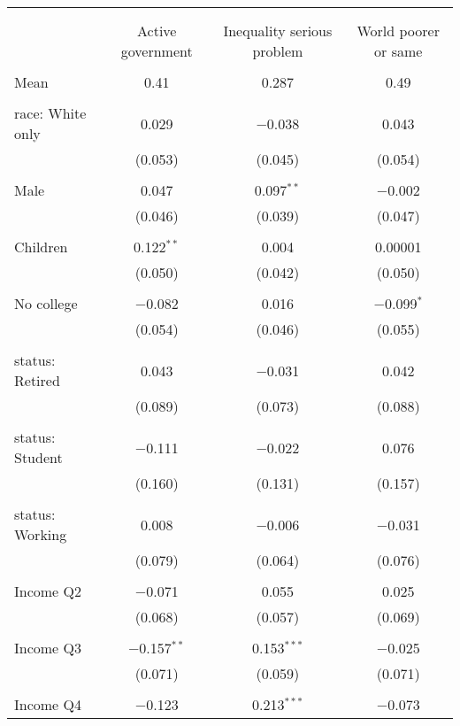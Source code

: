 
\begin{tabular}{@{\extracolsep{5pt}}lccc} 
\\[-1.8ex]\hline 
\hline \\[-1.8ex] 
\\[-1.8ex] & Active government & Inequality serious problem & World poorer or same \\ 
\hline \\[-1.8ex] 
 Mean & 0.41 & 0.287 & 0.49  \\ \hline \\[-1.8ex] race: White only & 0.029 & $-$0.038 & 0.043 \\ 
  & (0.053) & (0.045) & (0.054) \\ 
  & & & \\ 
 Male & 0.047 & 0.097$^{**}$ & $-$0.002 \\ 
  & (0.046) & (0.039) & (0.047) \\ 
  & & & \\ 
 Children & 0.122$^{**}$ & 0.004 & 0.00001 \\ 
  & (0.050) & (0.042) & (0.050) \\ 
  & & & \\ 
 No college & $-$0.082 & 0.016 & $-$0.099$^{*}$ \\ 
  & (0.054) & (0.046) & (0.055) \\ 
  & & & \\ 
 status: Retired & 0.043 & $-$0.031 & 0.042 \\ 
  & (0.089) & (0.073) & (0.088) \\ 
  & & & \\ 
 status: Student & $-$0.111 & $-$0.022 & 0.076 \\ 
  & (0.160) & (0.131) & (0.157) \\ 
  & & & \\ 
 status: Working & 0.008 & $-$0.006 & $-$0.031 \\ 
  & (0.079) & (0.064) & (0.076) \\ 
  & & & \\ 
 Income Q2 & $-$0.071 & 0.055 & 0.025 \\ 
  & (0.068) & (0.057) & (0.069) \\ 
  & & & \\ 
 Income Q3 & $-$0.157$^{**}$ & 0.153$^{***}$ & $-$0.025 \\ 
  & (0.071) & (0.059) & (0.071) \\ 
  & & & \\ 
 Income Q4 & $-$0.123 & 0.213$^{***}$ & $-$0.073 \\ 

\end{tabular}

